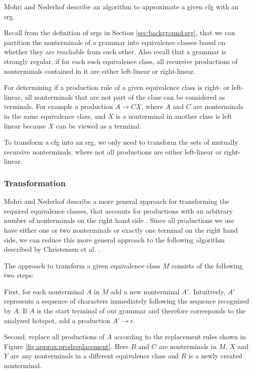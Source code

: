 Mohri and Nederhof \cite{mohri_nederhof} describe an algorithm to approximate a given \ac{cfg} with an \ac{srg}.

Recall from the definition of \acp{srg} in Section \ref{sec:background:srg}, that we can partition the nonterminals of a grammar into equivalence classes based on whether they are reachable from each other. Also recall that a grammar is strongly regular, if for each such equivalence class, all recursive productions of nonterminals contained in it are either left-linear or right-linear.

For determining if a production rule of a given equivalence class is right- or left-linear, all nonterminals that are not part of the class can be considered as terminals. For example a production $A \rightarrow CX$, where $A$ and $C$ are nonterminals in the same equivalence class, and $X$ is a nonterminal in another class is left linear because $X$ can be viewed as a terminal.

To transform a \ac{cfg} into an \ac{srg}, we only need to transform the sets of mutually recursive nonterminals, where not all productions are either left-linear or right-linear.

\subsubsection{Transformation}

Mohri and Nederhof describe a more general approach for transforming the required equivalence classes, that accounts for productions with an arbitrary number of nonterminals on the right hand side \cite{mohri_nederhof}. Since all productions we use have either one or two nonterminals or exactly one terminal on the right hand side, we can reduce this more general approach to the following algorithm described by Christensen et al. \cite{brics}.

The approach to transform a given equivalence class $M$ consists of the following two steps:

First, for each nonterminal $A$ in $M$ add a new nonterminal $A'$. Intuitively, $A'$ represents a sequence of characters immediately following the sequence recognized by $A$. If $A$ is the start terminal of our grammar and therefore corresponds to the analyzed hotspot, add a production $A' \rightarrow \epsilon$.

Second, replace all productions of $A$ according to the replacement rules shown in Figure \ref{fig:approx:prodreplacement}. Here $B$ and $C$ are nonterminals in $M$, $X$ and $Y$ are any nonterminals in a different equivalence class and $R$ is a newly created nonterminal.

